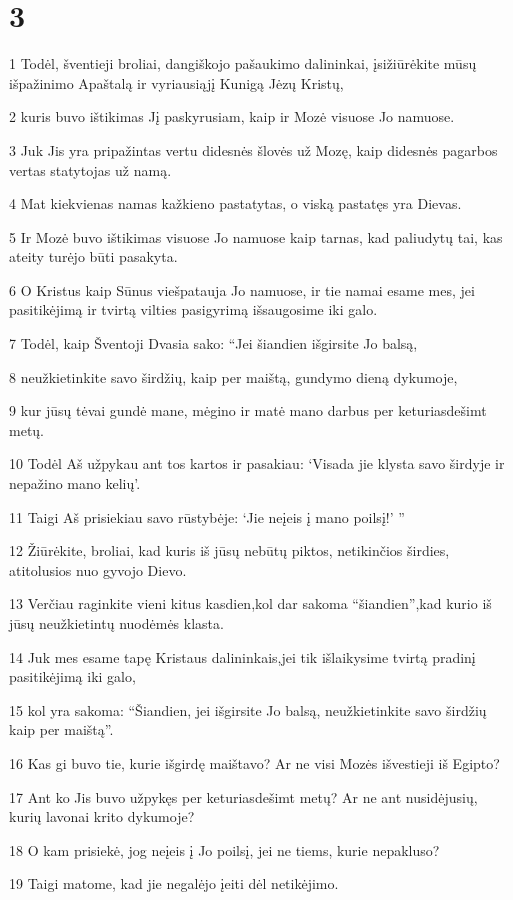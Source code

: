 \chapter{3}


\par 1 Todėl, šventieji broliai, dangiškojo pašaukimo dalininkai, įsižiūrėkite mūsų išpažinimo Apaštalą ir vyriausiąjį Kunigą Jėzų Kristų, 
\par 2 kuris buvo ištikimas Jį paskyrusiam, kaip ir Mozė visuose Jo namuose. 
\par 3 Juk Jis yra pripažintas vertu didesnės šlovės už Mozę, kaip didesnės pagarbos vertas statytojas už namą. 
\par 4 Mat kiekvienas namas kažkieno pastatytas, o viską pastatęs yra Dievas. 
\par 5 Ir Mozė buvo ištikimas visuose Jo namuose kaip tarnas, kad paliudytų tai, kas ateity turėjo būti pasakyta. 
\par 6 O Kristus kaip Sūnus viešpatauja Jo namuose, ir tie namai esame mes, jei pasitikėjimą ir tvirtą vilties pasigyrimą išsaugosime iki galo. 
\par 7 Todėl, kaip Šventoji Dvasia sako: “Jei šiandien išgirsite Jo balsą, 
\par 8 neužkietinkite savo širdžių, kaip per maištą, gundymo dieną dykumoje, 
\par 9 kur jūsų tėvai gundė mane, mėgino ir matė mano darbus per keturiasdešimt metų. 
\par 10 Todėl Aš užpykau ant tos kartos ir pasakiau: ‘Visada jie klysta savo širdyje ir nepažino mano kelių’. 
\par 11 Taigi Aš prisiekiau savo rūstybėje: ‘Jie neįeis į mano poilsį!’ ” 
\par 12 Žiūrėkite, broliai, kad kuris iš jūsų nebūtų piktos, netikinčios širdies, atitolusios nuo gyvojo Dievo. 
\par 13 Verčiau raginkite vieni kitus kasdien,­kol dar sakoma “šiandien”,­kad kurio iš jūsų neužkietintų nuodėmės klasta. 
\par 14 Juk mes esame tapę Kristaus dalininkais,­jei tik išlaikysime tvirtą pradinį pasitikėjimą iki galo, 
\par 15 kol yra sakoma: “Šiandien, jei išgirsite Jo balsą, neužkietinkite savo širdžių kaip per maištą”. 
\par 16 Kas gi buvo tie, kurie išgirdę maištavo? Ar ne visi Mozės išvestieji iš Egipto? 
\par 17 Ant ko Jis buvo užpykęs per keturiasdešimt metų? Ar ne ant nusidėjusių, kurių lavonai krito dykumoje? 
\par 18 O kam prisiekė, jog neįeis į Jo poilsį, jei ne tiems, kurie nepakluso? 
\par 19 Taigi matome, kad jie negalėjo įeiti dėl netikėjimo.


